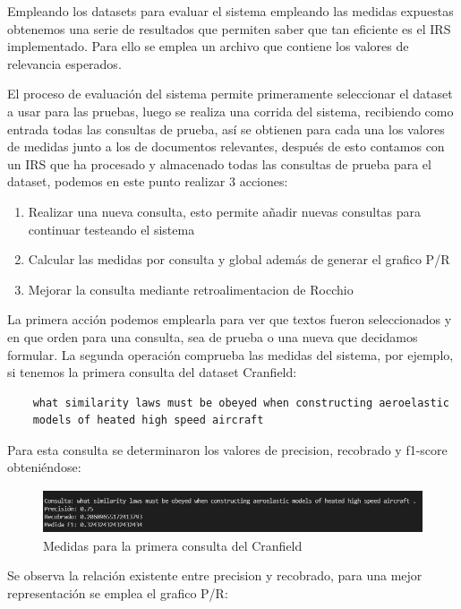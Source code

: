 \documentclass[runningheads,a4paper]{llncs}
\begin{document}
Empleando los datasets para evaluar el sistema empleando las medidas expuestas obtenemos una serie de resultados que permiten saber que tan eficiente es el IRS implementado. Para ello se emplea un archivo que contiene los valores de relevancia esperados. 

El proceso de evaluación del sistema permite primeramente seleccionar el dataset a usar para las pruebas, luego se realiza una corrida del sistema, recibiendo como entrada todas las consultas de prueba, así se obtienen para cada una los valores de medidas junto a los de documentos relevantes, después de esto contamos con un IRS que ha procesado y almacenado todas las consultas de prueba para el dataset, podemos en este punto realizar 3 acciones:

\begin{enumerate}
	\item Realizar una nueva consulta, esto permite añadir nuevas consultas para continuar testeando el sistema
	\item Calcular las medidas por consulta y global además de generar el grafico P/R 
	\item Mejorar la consulta mediante retroalimentacion de Rocchio
\end{enumerate}

La primera acción podemos emplearla para ver que textos fueron seleccionados y en que orden para una consulta, sea de prueba o una nueva que decidamos formular. La segunda operación comprueba las medidas del sistema, por ejemplo, si tenemos la primera consulta del dataset Cranfield: \\

\begin{verbatim}
	what similarity laws must be obeyed when constructing aeroelastic 
	models of heated high speed aircraft
\end{verbatim}

Para esta consulta se determinaron los valores de precision, recobrado y f1-score obteniéndose:

\begin{figure}
	\centering
	\includegraphics[height=1.3cm]{imgs/eval_query1_cran.png}
	\caption{Medidas para la primera consulta del Cranfield}
	\label{fig:cran1}
\end{figure}

Se observa la relación existente entre precision y recobrado, para una mejor representación se emplea el grafico P/R:
\end{document}
